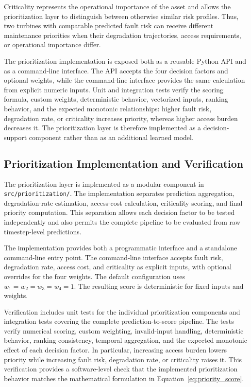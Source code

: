 \documentclass[conference]{IEEEtran}
\begin{document}
Criticality represents the operational importance of the asset and allows
the prioritization layer to distinguish between otherwise similar risk
profiles. Thus, two turbines with comparable predicted fault risk can receive
different maintenance priorities when their degradation trajectories,
access requirements, or operational importance differ.

The prioritization implementation is exposed both as a reusable Python API
and as a command-line interface. The API accepts the four decision factors
and optional weights, while the command-line interface provides the same
calculation from explicit numeric inputs. Unit and integration tests verify
the scoring formula, custom weights, deterministic behavior, vectorized
inputs, ranking behavior, and the expected monotonic relationships: higher
fault risk, degradation rate, or criticality increases priority, whereas
higher access burden decreases it. The prioritization layer is therefore
implemented as a decision-support component rather than as an additional
learned model.
\subsection{Prioritization Implementation and Verification}

The prioritization layer is implemented as a modular component in
\texttt{src/prioritization/}. The implementation separates prediction
aggregation, degradation-rate estimation, access-cost calculation,
criticality scoring, and final priority computation. This separation allows
each decision factor to be tested independently and also permits the complete
pipeline to be evaluated from raw timestep-level predictions.

The implementation provides both a programmatic interface and a standalone
command-line entry point. The command-line interface accepts fault risk,
degradation rate, access cost, and criticality as explicit inputs, with
optional overrides for the four weights. The default configuration uses
$w_1=w_2=w_3=w_4=1$. The resulting score is deterministic for fixed inputs
and weights.

Verification includes unit tests for the individual prioritization
components and integration tests covering the complete prediction-to-score
pipeline. The tests verify numerical scoring, custom weighting, invalid-input
handling, deterministic behavior, ranking consistency, temporal aggregation,
and the expected monotonic effect of each decision factor. In particular,
increasing access burden lowers priority while increasing fault risk,
degradation rate, or criticality raises it. This verification provides a
software-level check that the implemented prioritization behavior matches
the mathematical formulation in Equation~\ref{eq:priority_score}.
\end{document}
